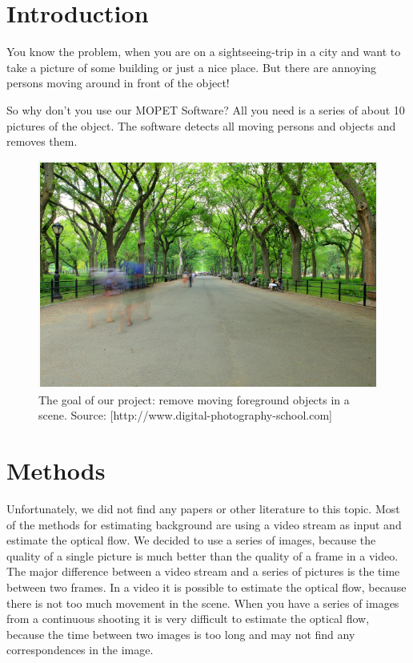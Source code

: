 \chapter{Introduction}

You know the problem, when you are on a sightseeing-trip in a city and want to take a picture of some
building or just a nice place. But there are annoying persons moving around in front
of the object!

So why don't you use our MOPET Software?
All you need is a series of about 10 pictures of the object. The software 
detects all moving persons and objects and removes them.

\begin{figure}[h!]
 \centering
 \includegraphics[width=\textwidth]{./pics/intro.png}
 \caption{The goal of our project: remove moving foreground objects in a scene.
 Source: [http://www.digital-photography-school.com]}
 \label{fig:intro}
\end{figure}



\chapter{Methods}

Unfortunately, we did not find any papers or other literature to this topic. Most of the methods for estimating
background are using a video stream as input and estimate the optical flow.
We decided to use a series of images,
because the quality of a single picture is much better than the quality of a frame in a video.
The major difference between a video stream and a series of pictures is the time between two frames.
In a video it is possible to estimate the optical flow, because there is not too much movement in the scene.
When you have a series of images from a continuous shooting it is very difficult to estimate the optical flow, because the time between
two images is too long and may not find any correspondences in the image.

